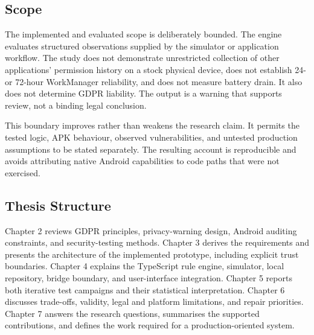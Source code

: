 \subsection{Scope}

The implemented and evaluated scope is deliberately bounded. The engine evaluates structured observations supplied by the simulator or application workflow. The study does not demonstrate unrestricted collection of other applications' permission history on a stock physical device, does not establish 24- or 72-hour WorkManager reliability, and does not measure battery drain. It also does not determine GDPR liability. The output is a warning that supports review, not a binding legal conclusion.

This boundary improves rather than weakens the research claim. It permits the tested logic, APK behaviour, observed vulnerabilities, and untested production assumptions to be stated separately. The resulting account is reproducible and avoids attributing native Android capabilities to code paths that were not exercised.

\subsection{Thesis Structure}

Chapter 2 reviews GDPR principles, privacy-warning design, Android auditing constraints, and security-testing methods. Chapter 3 derives the requirements and presents the architecture of the implemented prototype, including explicit trust boundaries. Chapter 4 explains the TypeScript rule engine, simulator, local repository, bridge boundary, and user-interface integration. Chapter 5 reports both iterative test campaigns and their statistical interpretation. Chapter 6 discusses trade-offs, validity, legal and platform limitations, and repair priorities. Chapter 7 answers the research questions, summarises the supported contributions, and defines the work required for a production-oriented system.
